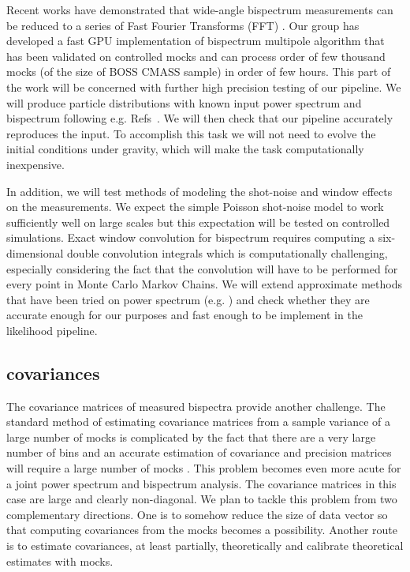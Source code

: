 Recent works have demonstrated that wide-angle bispectrum measurements can
be reduced to a series of Fast Fourier Transforms (FFT)
\cite{2015PhRvD..92h3532S,2018arXiv180302132S}. Our group has developed a fast
GPU implementation of bispectrum multipole algorithm that has been validated on
controlled mocks and can process order of few thousand mocks (of the size of
BOSS CMASS sample) in order of few hours. This part of the work will be
concerned with further high precision testing of our pipeline. We will produce
particle distributions with known input power spectrum and bispectrum following
e.g. Refs~\cite{2012PhRvD..85h3002S,2012PhRvD..86l3524R,2010JCAP...10..022W}.
We will then check that our pipeline accurately reproduces the input. To
accomplish this task we will not need to evolve the initial conditions under
gravity, which will make the task computationally inexpensive. 

In addition, we will test methods of modeling the shot-noise and window effects
on the measurements. We expect the simple Poisson shot-noise model to work
sufficiently well on large scales but this expectation will be tested on
controlled simulations. Exact window convolution for bispectrum requires
computing a six-dimensional double convolution integrals which is
computationally challenging, especially considering the fact that the
convolution will have to be performed for every point in Monte Carlo Markov
Chains. We will extend approximate methods that have been tried on power
spectrum (e.g. \cite{2017MNRAS.464.3121W}) and check whether they are accurate
enough for our purposes and fast enough to be implement in the likelihood
pipeline. 

\subsection*{covariances}

The covariance matrices of measured bispectra provide another challenge. The
standard method of estimating covariance matrices from a sample variance of a
large number of mocks is complicated by the fact that there are a very large
number of bins and an accurate estimation of covariance and precision matrices
will require a large number of mocks
\cite{2006MNRAS.371.1188H,2007A&A...464..399H,2013MNRAS.432.1928T,2013PhRvD..88f3537D,2014MNRAS.439.2531P,2014MNRAS.442.2728T}.
This problem becomes even more acute for a joint power spectrum and bispectrum
analysis. The covariance matrices in this case are large and clearly
non-diagonal.  We plan to tackle this problem from two complementary
directions. One is to somehow reduce the size of data vector so that computing
covariances from the mocks becomes a possibility. Another route is to estimate
covariances, at least partially, theoretically and calibrate theoretical
estimates with mocks. 

